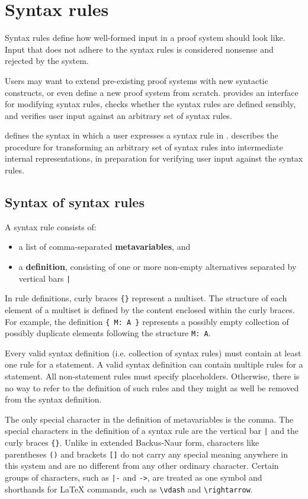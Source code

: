 \chapter{Syntax rules}
\label{chapter:syntax}
Syntax rules define how well-formed input in a proof system should look like. Input that does not adhere to the syntax rules is considered nonsense and rejected by the system.

Users may want to extend pre-existing proof systems with new syntactic constructs, or even define a new proof system from scratch. \projectname{} provides an interface for modifying syntax rules, checks whether the syntax rules are defined sensibly, and verifies user input against an arbitrary set of syntax rules.

 defines the syntax in which a user expresses a syntax rule in \projectname{}.  describes the procedure for transforming an arbitrary set of syntax rules into intermediate internal representations, in preparation for verifying user input against the syntax rules.

\section{Syntax of syntax rules}
\label{syntax:syntax}
A syntax rule consists of:
\begin{itemize}
    \item a list of comma-separated \textbf{metavariables}, and
    \item a \textbf{definition}, consisting of one or more non-empty alternatives separated by vertical bars \lstinline{|}
\end{itemize}
In rule definitions, curly braces \lstinline|{}| represent a multiset. The structure of each element of a multiset is defined by the content enclosed within the curly braces. For example, the definition \lstinline|{ M: A }| represents a possibly empty collection of possibly duplicate elements following the structure \lstinline{M: A}.

Every valid syntax definition (i.e. collection of syntax rules) must contain at least one rule for a statement. A valid syntax definition can contain multiple rules for a statement. All non-statement rules must specify placeholders. Otherwise, there is no way to refer to the definition of such rules and they might as well be removed from the syntax definition.

The only special character in the definition of metavariables is the comma. The special characters in the definition of a syntax rule are the vertical bar \lstinline{|} and the curly braces \lstinline|{}|. Unlike in extended Backus-Naur form, characters like parentheses \lstinline{()} and brackets \lstinline{[]} do not carry any special meaning anywhere in this system and are no different from any other ordinary character. Certain groups of characters, such as \lstinline{|-} and \lstinline{->}, are treated as one symbol and shorthands for \LaTeX{} commands, such as \lstinline{\vdash} and \lstinline{\rightarrow}.

